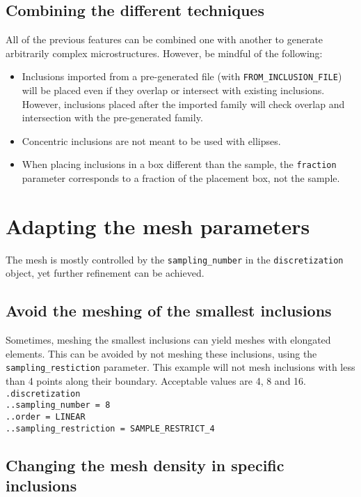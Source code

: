 \documentclass[10pt]{article}
\begin{document}
\subsection{Combining the different techniques}

All of the previous features can be combined one with another to generate arbitrarily complex microstructures. However, be mindful of the following:

\begin{itemize}
	\item Inclusions imported from a pre-generated file (with \verb+FROM_INCLUSION_FILE+) will be placed even if they overlap or intersect with existing inclusions. However, inclusions placed after the imported family will check overlap and intersection with the pre-generated family.
	\item Concentric inclusions are not meant to be used with ellipses.
	\item When placing inclusions in a box different than the sample, the \verb+fraction+ parameter corresponds to a fraction of the placement box, not the sample.
\end{itemize}

\section{Adapting the mesh parameters}

The mesh is mostly controlled by the \verb+sampling_number+ in the \verb+discretization+ object, yet further refinement can be achieved.

\subsection{Avoid the meshing of the smallest inclusions}

Sometimes, meshing the smallest inclusions can yield meshes with elongated elements. This can be avoided by not meshing these inclusions, using the \verb+sampling_restiction+ parameter. This example will not mesh inclusions with less than 4 points along their boundary. Acceptable values are 4, 8 and 16.\\

\noindent \verb+.discretization+\\
\verb+..sampling_number = 8+\\
\verb+..order = LINEAR+\\
\verb+..sampling_restriction = SAMPLE_RESTRICT_4+

\subsection{Changing the mesh density in specific inclusions}
\end{document}
